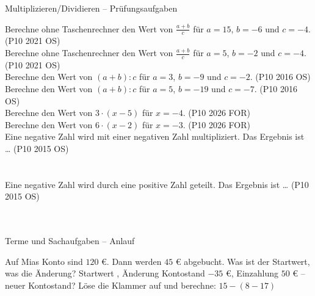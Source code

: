 \begin{aufgabe}{Multiplizieren/Dividieren – Prüfungsaufgaben}
\begin{teile}
\teil Berechne ohne Taschenrechner den Wert von $\frac{a + b}{c}$ für $a = 15$, $b = -6$ und $c = -4$. \hfill (P10 2021 OS) \\ \leerfeld
\teil Berechne ohne Taschenrechner den Wert von $\frac{a + b}{c}$ für $a = 5$, $b = -2$ und $c = -4$. \hfill (P10 2021 OS) \\ \leerfeld
\teil Berechne den Wert von $(a + b) : c$ für $a = 3$, $b = -9$ und $c = -2$. \hfill (P10 2016 OS) \\ \leerfeld
\teil Berechne den Wert von $(a + b) : c$ für $a = 5$, $b = -19$ und $c = -7$. \hfill (P10 2016 OS) \\ \leerfeld
\teil Berechne den Wert von $3 \cdot (x - 5)$ für $x = -4$. \hfill (P10 2026 FOR) \\ \leerfeld
\teil Berechne den Wert von $6 \cdot (x - 2)$ für $x = -3$. \hfill (P10 2026 FOR) \\ \leerfeld
\teil Eine negative Zahl wird mit einer negativen Zahl multipliziert. Das Ergebnis ist … \hfill (P10 2015 OS)\\ \\ \\ 
\teil Eine negative Zahl wird durch eine positive Zahl geteilt. Das Ergebnis ist … \hfill (P10 2015 OS)\\ \\ \\ 
\end{teile}
\end{aufgabe}

\begin{aufgabe}{Terme und Sachaufgaben – Anlauf}
\begin{teile}
\teil Auf Mias Konto sind $120$ €. Dann werden $45$ € abgebucht. Was ist der Startwert, was die Änderung? Startwert \leerfeld , Änderung \leerfeld
\teil Kontostand $-35$ €, Einzahlung $50$ € – neuer Kontostand? \leerfeld[€]
\teil Löse die Klammer auf und berechne: $15 - (8 - 17)$ \leerfeld
\end{teile}
\end{aufgabe}

